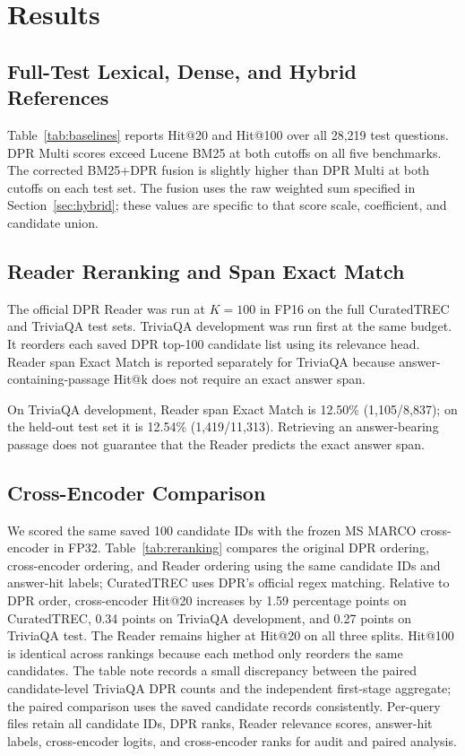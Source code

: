 \section{Results}
\subsection{Full-Test Lexical, Dense, and Hybrid References}
Table~\ref{tab:baselines} reports Hit@20 and Hit@100 over all 28,219 test questions. DPR Multi scores exceed Lucene BM25 at both cutoffs on all five benchmarks. The corrected BM25+DPR fusion is slightly higher than DPR Multi at both cutoffs on each test set. The fusion uses the raw weighted sum specified in Section~\ref{sec:hybrid}; these values are specific to that score scale, coefficient, and candidate union.



\subsection{Reader Reranking and Span Exact Match}
The official DPR Reader was run at $K=100$ in FP16 on the full CuratedTREC and TriviaQA test sets. TriviaQA development was run first at the same budget. It reorders each saved DPR top-100 candidate list using its relevance head. Reader span Exact Match is reported separately for TriviaQA because answer-containing-passage Hit@k does not require an exact answer span.



On TriviaQA development, Reader span Exact Match is 12.50\% (1,105/8,837); on the held-out test set it is 12.54\% (1,419/11,313). Retrieving an answer-bearing passage does not guarantee that the Reader predicts the exact answer span.

\subsection{Cross-Encoder Comparison}
We scored the same saved 100 candidate IDs with the frozen MS MARCO cross-encoder in FP32. Table~\ref{tab:reranking} compares the original DPR ordering, cross-encoder ordering, and Reader ordering using the same candidate IDs and answer-hit labels; CuratedTREC uses DPR's official regex matching. Relative to DPR order, cross-encoder Hit@20 increases by 1.59 percentage points on CuratedTREC, 0.34 points on TriviaQA development, and 0.27 points on TriviaQA test. The Reader remains higher at Hit@20 on all three splits. Hit@100 is identical across rankings because each method only reorders the same candidates. The table note records a small discrepancy between the paired candidate-level TriviaQA DPR counts and the independent first-stage aggregate; the paired comparison uses the saved candidate records consistently. Per-query files retain all candidate IDs, DPR ranks, Reader relevance scores, answer-hit labels, cross-encoder logits, and cross-encoder ranks for audit and paired analysis.

